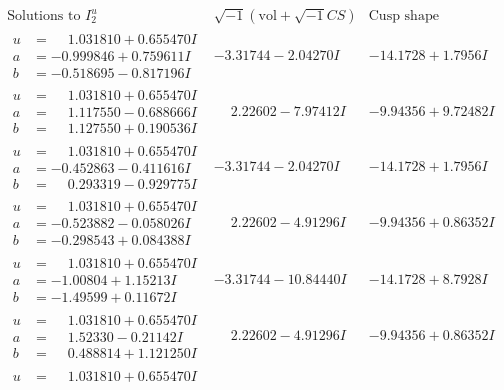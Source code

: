 \documentclass[1p]{elsarticle_modified}
\theoremstyle{definition}
\newcommand{\I}{\sqrt{-1}}
\begin{document}
$$\begin{array}{c|c|c}
\text{Solutions to }I^u_{2}& \I (\text{vol} + \sqrt{-1}CS) & \text{Cusp shape}\\
 \hline 
\begin{aligned}
u &= \phantom{-}1.031810 + 0.655470 I \\
a &= -0.999846 + 0.759611 I \\
b &= -0.518695 - 0.817196 I\end{aligned}
 & -3.31744 - 2.04270 I & -14.1728 + 1.7956 I \\ \hline\begin{aligned}
u &= \phantom{-}1.031810 + 0.655470 I \\
a &= \phantom{-}1.117550 - 0.688666 I \\
b &= \phantom{-}1.127550 + 0.190536 I\end{aligned}
 & \phantom{-}2.22602 - 7.97412 I & -9.94356 + 9.72482 I \\ \hline\begin{aligned}
u &= \phantom{-}1.031810 + 0.655470 I \\
a &= -0.452863 - 0.411616 I \\
b &= \phantom{-}0.293319 - 0.929775 I\end{aligned}
 & -3.31744 - 2.04270 I & -14.1728 + 1.7956 I \\ \hline\begin{aligned}
u &= \phantom{-}1.031810 + 0.655470 I \\
a &= -0.523882 - 0.058026 I \\
b &= -0.298543 + 0.084388 I\end{aligned}
 & \phantom{-}2.22602 - 4.91296 I & -9.94356 + 0.86352 I \\ \hline\begin{aligned}
u &= \phantom{-}1.031810 + 0.655470 I \\
a &= -1.00804 + 1.15213 I \\
b &= -1.49599 + 0.11672 I\end{aligned}
 & -3.31744 - 10.84440 I & -14.1728 + 8.7928 I \\ \hline\begin{aligned}
u &= \phantom{-}1.031810 + 0.655470 I \\
a &= \phantom{-}1.52330 - 0.21142 I \\
b &= \phantom{-}0.488814 + 1.121250 I\end{aligned}
 & \phantom{-}2.22602 - 4.91296 I & -9.94356 + 0.86352 I \\ \hline\begin{aligned}
u &= \phantom{-}1.031810 + 0.655470 I \\

\end{aligned}
\end{array}$$
\end{document}
